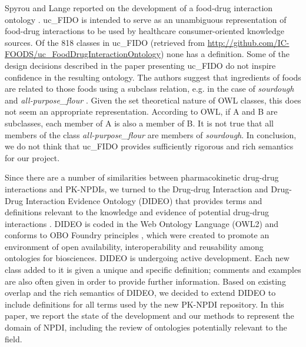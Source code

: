 \documentclass{bmcart}
\begin{document}
Spyrou and Lange reported on the development of a food-drug interaction ontology \cite{Spyrou2016}.
uc\_FIDO is intended to serve as an unambiguous representation of food-drug interactions to be used by healthcare consumer-oriented knowledge sources.
Of the 818 classes in uc\_FIDO (retrieved from \url{http://github.com/IC-FOODS/uc_FoodDrugInteractionOntology}) none has a definition.
Some of the design decisions described in the paper presenting uc\_FIDO do not inspire confidence in the resulting ontology. The authors suggest that ingredients of foods are related to those foods using a subclass relation, e.g. in the case of \textit{sourdough} and \textit{all-purpose\_flour} \cite{Spyrou2016}.
Given the set theoretical nature of OWL classes, this does not seem an appropriate representation.
According to OWL, if A and B are subclasses, each member of A is also a member of B.
It is not true that all members of the class \textit{all-purpose\_flour} are members of \textit{sourdough}.
In  conclusion, we do not think that uc\_FIDO provides sufficiently rigorous and rich semantics for our project.

Since there are a number of similarities between pharmacokinetic drug-drug interactions and PK-NPDIs, we turned to the Drug-drug Interaction and Drug-Drug Interaction Evidence Ontology (DIDEO) \cite{dideo_owl} that provides terms and definitions relevant to the knowledge and evidence of potential drug-drug interactions \cite{Brochhausen}.
DIDEO is coded in the Web Ontology Language (OWL2) and conforms to OBO Foundry principles \cite{obofoundry}, which were created to promote an environment of open availability, interoperability and reusability among ontologies for biosciences.
DIDEO is undergoing active development. Each new class added to it is given a unique and specific definition; comments and examples are also often given in order to provide further information.
Based on existing overlap and the rich semantics of DIDEO, we decided to extend DIDEO to include definitions for all terms used by the new PK-NPDI repository. In this paper, we report the state of the development and our methods to represent the domain of NPDI, including the review of ontologies potentially relevant to the field.
\end{document}
